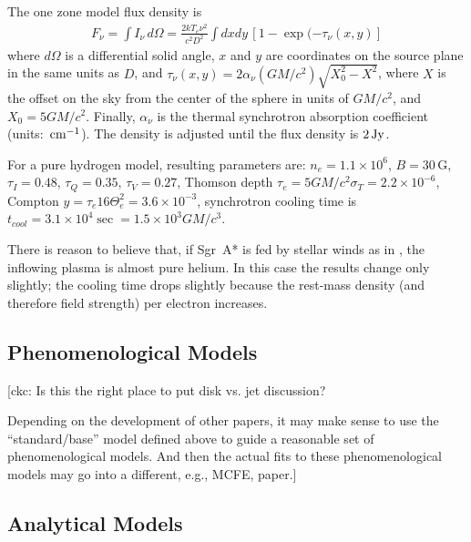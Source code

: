 \documentclass[twocolumn,tighten,dvipsnames]{aastex63}
\newcommand\sgra{Sgr~A*\xspace}
\newcommand\mbh{{M}} %
\newcommand\Jy{{\rm \, Jy}}
\newcommand\cm{{\rm \, cm}}
\newcommand\<{{\langle}}
\renewcommand\>{{\rangle}} %
\newcommand\ckc[1]{{\color{MidnightBlue}[ckc: #1]}}
\begin{document}
The one zone model flux density is
\begin{align}
  F_\nu = \int I_\nu \, d\Omega =
  \frac{2 k T_e \nu^2}{c^2 D^2} \int dx dy\,\left[1 - \exp(-\tau_\nu(x,y)\right]
\end{align}
where $d\Omega$ is a differential solid angle, $x$ and $y$ are
coordinates on the source plane in the same units as $D$, and
$\tau_\nu(x,y) = 2 \alpha_\nu (G\mbh/c^2) \sqrt{X_0^2 - X^2}$, where
$X$ is the offset on the sky from the center of the sphere in units of
$GM/c^2$, and $X_0 = 5 G\mbh/c^2$.
Finally, $\alpha_\nu$ is the thermal synchrotron absorption
coefficient (units: $\cm^{-1}$).
The density is adjusted until the flux density is $2\Jy$.

For a pure hydrogen model, resulting parameters are: $n_e = 1.1 \times
10^6$, $B = 30\,\mathrm{G}$, $\tau_I = 0.48$, $\tau_Q = 0.35 $,
$\tau_V = 0.27$, Thomson depth $\tau_e = 5 G\mbh/c^2 \sigma_T = 2.2
\times 10^{-6}$, Compton $y = \tau_e 16 \Theta_e^2 = 3.6 \times
10^{-3}$, synchrotron cooling time is $t_{cool} = 3.1 \times 10^4\sec
= 1.5 \times 10^3 G\mbh/c^3$.

There is reason to believe that, if \sgra is fed by stellar winds as
in \citet{2019MNRAS.482L.123R}, the inflowing plasma is almost pure
helium.
In this case the results change only slightly; the cooling time drops
slightly because the rest-mass density (and therefore field strength)
per electron increases.

\subsection{Phenomenological Models}
\label{sec:phenomodels}

\ckc{Is this the right place to put disk vs. jet discussion?

  Depending on the development of other papers, it may make sense
  to use the ``standard/base'' model defined above to guide a
  reasonable set of phenomenological models.
  And then the actual fits to these phenomenological models may go
  into a different, e.g., MCFE, paper.}

\subsection{Analytical Models}
\label{sec:anamodels}
\end{document}

